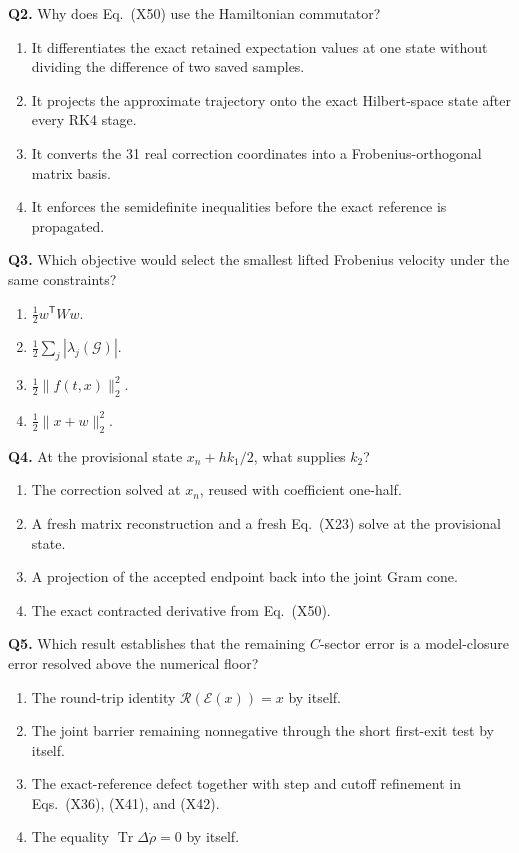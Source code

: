 \documentclass[10pt,letterpaper,twocolumn]{article}
\begin{document}
\textbf{Q2.} Why does Eq.~(X50) use the Hamiltonian commutator?
\begin{enumerate}[label=\Alph*.]
  \item It differentiates the exact retained expectation values at one state
  without dividing the difference of two saved samples.
  \item It projects the approximate trajectory onto the exact Hilbert-space
  state after every RK4 stage.
  \item It converts the 31 real correction coordinates into a Frobenius-orthogonal
  matrix basis.
  \item It enforces the semidefinite inequalities before the exact reference is
  propagated.
\end{enumerate}

\textbf{Q3.} Which objective would select the smallest lifted Frobenius
velocity under the same constraints?
\begin{enumerate}[label=\Alph*.]
  \item \(\tfrac12w^{\mathsf T}Ww\).
  \item \(\tfrac12\sum_j|\lambda_j(\mathcal G)|\).
  \item \(\tfrac12\lVert f(t,x)\rVert_2^2\).
  \item \(\tfrac12\lVert x+w\rVert_2^2\).
\end{enumerate}

\textbf{Q4.} At the provisional state \(x_n+hk_1/2\), what supplies \(k_2\)?
\begin{enumerate}[label=\Alph*.]
  \item The correction solved at \(x_n\), reused with coefficient one-half.
  \item A fresh matrix reconstruction and a fresh Eq.~(X23) solve at the
  provisional state.
  \item A projection of the accepted endpoint back into the joint Gram cone.
  \item The exact contracted derivative from Eq.~(X50).
\end{enumerate}

\textbf{Q5.} Which result establishes that the remaining \(C\)-sector error
is a model-closure error resolved above the numerical floor?
\begin{enumerate}[label=\Alph*.]
  \item The round-trip identity \(\mathcal R(\mathcal E(x))=x\) by itself.
  \item The joint barrier remaining nonnegative through the short first-exit
  test by itself.
  \item The exact-reference defect together with step and cutoff refinement in
  Eqs.~(X36), (X41), and (X42).
  \item The equality \(\operatorname{Tr}\Delta\dot\rho=0\) by itself.
\end{enumerate}
\end{document}
